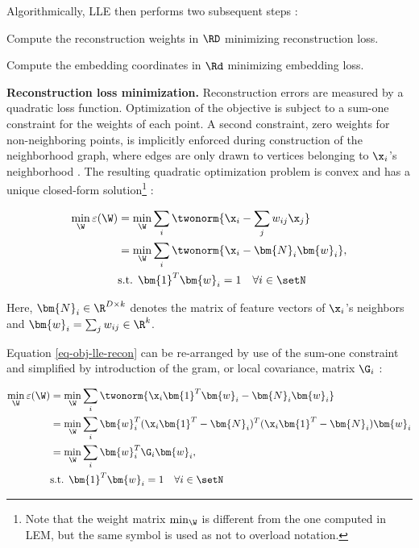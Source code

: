 Algorithmically, LLE then performs two subsequent steps \citep{roweissaul2000}:

\begin{tight_enumerate}
  \item Compute the reconstruction weights in $\RD$ minimizing reconstruction 
  loss.
  \item Compute the embedding coordinates in $\Rd$ minimizing embedding loss.
\end{tight_enumerate}

\textbf{Reconstruction loss minimization.}
Reconstruction errors are measured by a quadratic loss function.
Optimization of the objective is subject to a sum-one constraint for the weights
of each point.
A second constraint, zero weights for non-neighboring points, is implicitly
enforced during construction of the neighborhood graph, where edges are only
drawn to vertices belonging to $\x_i$'s neighborhood \citep{ghojoghetal2020}.
The resulting quadratic optimization problem is convex and has a unique
closed-form solution\footnote{
Note that the weight matrix $\min_{\W}$ is different from the one computed in
LEM, but the same symbol is used as not to overload notation.
} \citep{roweissaul2000}:

\begin{equation}
  \begin{split}
    \min_{\W} \varepsilon(\W) &= \min_{\W} \sum_i
    \twonorm{\x_i - \sum_j w_{ij} \x_j} \\
    &= \min_{\W} \sum_i \twonorm{\x_i - \bm{N}_i \bm{w}_i}, \\
    & \text{s.t. } \bm{1}^T \bm{w}_i = 1 \quad \forall i \in \setN
  \end{split}
  \label{eq-obj-lle-recon}
\end{equation}

Here, $\bm{N}_i \in \R^{D \times k}$ denotes the matrix of feature vectors of
$\x_i$'s neighbors and $\bm{w}_i = \sum_j w_{ij} \in \R^k$.

Equation \ref{eq-obj-lle-recon} can be re-arranged by use of the sum-one
constraint and simplified by introduction of the gram, or local covariance,
matrix $\G_i$ \citep{saulroweis2001}:

\begin{equation}
  \begin{split}
    \min_{\W} \varepsilon(\W) &= \min_{\W} \sum_i \twonorm{\x_i \bm{1}^T
    \bm{w}_i - \bm{N}_i \bm{w}_i} \\
    &= \min_{\W} \sum_i \bm{w}_i^T (\x_i \bm{1}^T - \bm{N}_i)^T
    (\x_i \bm{1}^T - \bm{N}_i) \bm{w}_i \\
    &= \min_{\W} \sum_i \bm{w}_i^T \G_i \bm{w}_i, \\
    & \text{s.t. } \bm{1}^T \bm{w}_i = 1 \quad \forall i \in \setN
  \end{split}
  \label{eq-obj-lle-recon-2}
\end{equation}


